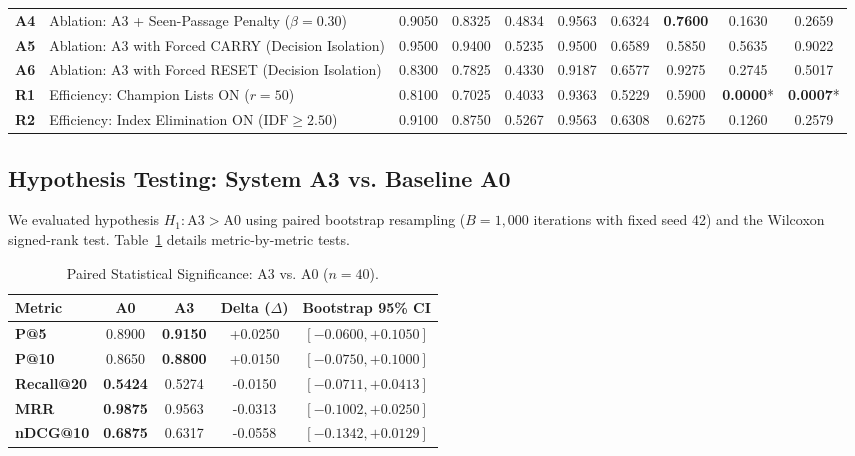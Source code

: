 \documentclass[10pt,a4paper,twocolumn]{article}
\begin{document}
\begin{table}[t]
\begin{tabularx}{\textwidth}{c p{4.8cm} c c c c c c c c}
\textbf{A4} & Ablation: A3 + Seen-Passage Penalty ($\beta = 0.30$) & 0.9050 & 0.8325 & 0.4834 & 0.9563 & 0.6324 & \textbf{0.7600} & 0.1630 & 0.2659 \\
\textbf{A5} & Ablation: A3 with Forced CARRY (Decision Isolation) & 0.9500 & 0.9400 & 0.5235 & 0.9500 & 0.6589 & 0.5850 & 0.5635 & 0.9022 \\
\textbf{A6} & Ablation: A3 with Forced RESET (Decision Isolation) & 0.8300 & 0.7825 & 0.4330 & 0.9187 & 0.6577 & 0.9275 & 0.2745 & 0.5017 \\
\midrule
\textbf{R1} & Efficiency: Champion Lists ON ($r=50$) & 0.8100 & 0.7025 & 0.4033 & 0.9363 & 0.5229 & 0.5900 & \textbf{0.0000}* & \textbf{0.0007}* \\
\textbf{R2} & Efficiency: Index Elimination ON ($\text{IDF} \ge 2.50$) & 0.9100 & 0.8750 & 0.5267 & 0.9563 & 0.6308 & 0.6275 & 0.1260 & 0.2579 \\
\bottomrule
\end{tabularx}
\end{table}

\subsection{Hypothesis Testing: System A3 vs. Baseline A0}
We evaluated hypothesis $H_1: \text{A3} > \text{A0}$ using paired bootstrap resampling ($B=1,000$ iterations with fixed seed 42) and the Wilcoxon signed-rank test. Table~\ref{tab:significance} details metric-by-metric tests.

\begin{table}[H]
\centering
\scriptsize
\caption{Paired Statistical Significance: A3 vs. A0 ($n=40$).}
\label{tab:significance}
\begin{tabularx}{\columnwidth}{l c c c c}
\toprule
\textbf{Metric} & \textbf{A0} & \textbf{A3} & \textbf{Delta ($\Delta$)} & \textbf{Bootstrap 95\% CI} \\
\midrule
\textbf{P@5} & 0.8900 & \textbf{0.9150} & +0.0250 & $[-0.0600, +0.1050]$ \\
\textbf{P@10} & 0.8650 & \textbf{0.8800} & +0.0150 & $[-0.0750, +0.1000]$ \\
\textbf{Recall@20} & \textbf{0.5424} & 0.5274 & -0.0150 & $[-0.0711, +0.0413]$ \\
\textbf{MRR} & \textbf{0.9875} & 0.9563 & -0.0313 & $[-0.1002, +0.0250]$ \\
\textbf{nDCG@10} & \textbf{0.6875} & 0.6317 & -0.0558 & $[-0.1342, +0.0129]$ \\
\bottomrule
\end{tabularx}
\end{table}
\end{document}
